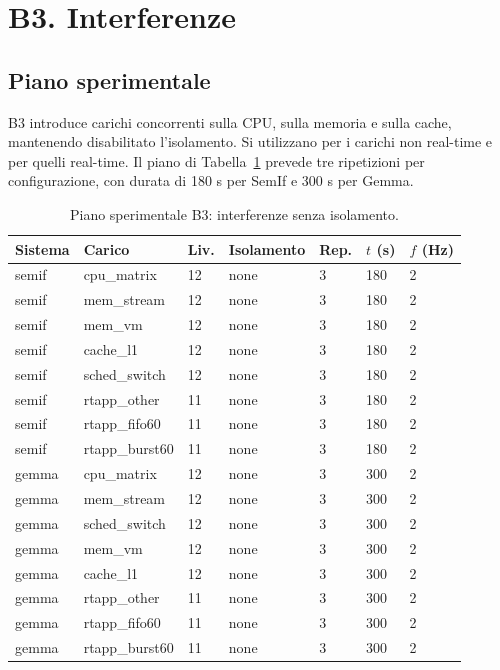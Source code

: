 \documentclass[conference]{IEEEtran}
\newcommand{\code}[1]{\texttt{\detokenize{#1}}}
\begin{document}
\section{B3. Interferenze}\label{sec:b3}

\subsection{Piano sperimentale}
B3 introduce carichi concorrenti sulla CPU, sulla memoria e sulla cache, mantenendo disabilitato l'isolamento. Si utilizzano \code{stress-ng} per i carichi non real-time e \code{rt-app} per quelli real-time. Il piano di Tabella~\ref{tab:b3} prevede tre ripetizioni per configurazione, con durata di 180 s per SemIf e 300 s per Gemma.

\begin{table}[!htbp]
\centering
\caption{Piano sperimentale B3: interferenze senza isolamento.}\label{tab:b3}
\scriptsize
\setlength{\tabcolsep}{2pt}
\begin{tabular*}{\columnwidth}{@{\extracolsep{\fill}}lllllll@{}}
\toprule
Sistema & Carico & Liv. & Isolamento & Rep. & $t$ (s) & $f$ (Hz) \\
\midrule
semif & cpu\_matrix & 12 & none & 3 & 180 & 2 \\
semif & mem\_stream & 12 & none & 3 & 180 & 2 \\
semif & mem\_vm & 12 & none & 3 & 180 & 2 \\
semif & cache\_l1 & 12 & none & 3 & 180 & 2 \\
semif & sched\_switch & 12 & none & 3 & 180 & 2 \\
semif & rtapp\_other & 11 & none & 3 & 180 & 2 \\
semif & rtapp\_fifo60 & 11 & none & 3 & 180 & 2 \\
semif & rtapp\_burst60 & 11 & none & 3 & 180 & 2 \\
gemma & cpu\_matrix & 12 & none & 3 & 300 & 2 \\
gemma & mem\_stream & 12 & none & 3 & 300 & 2 \\
gemma & sched\_switch & 12 & none & 3 & 300 & 2 \\
gemma & mem\_vm & 12 & none & 3 & 300 & 2 \\
gemma & cache\_l1 & 12 & none & 3 & 300 & 2 \\
gemma & rtapp\_other & 11 & none & 3 & 300 & 2 \\
gemma & rtapp\_fifo60 & 11 & none & 3 & 300 & 2 \\
gemma & rtapp\_burst60 & 11 & none & 3 & 300 & 2 \\
\bottomrule
\end{tabular*}
\end{table}
\end{document}
